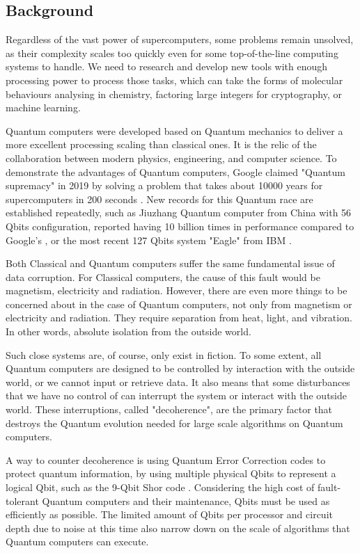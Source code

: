 \subsection{Background}

Regardless of the vast power of supercomputers, some problems remain unsolved, as their complexity scales too quickly even for some top-of-the-line computing systems to handle. 
We need to research and develop new tools with enough processing power to process those tasks, which can take the forms of molecular behaviours analysing in chemistry, factoring large integers for cryptography, or machine learning.

Quantum computers were developed based on Quantum mechanics to deliver a more excellent processing scaling than classical ones.
It is the relic of the collaboration between modern physics, engineering, and computer science.
To demonstrate the advantages of Quantum computers, Google claimed "Quantum supremacy" in 2019 by solving a problem that takes about 10000 years for supercomputers in 200 seconds \cite{hsuGoogleQuantumTech2019}.
New records for this Quantum race are established repeatedly, such as Jiuzhang Quantum computer from China with 56 Qbits configuration, reported having 10 billion times in performance compared to Google's \cite{zhongQuantumComputationalAdvantage2020}, or the most recent 127 Qbits system "Eagle" from IBM \cite{chow2021ibm}.

Both Classical and Quantum computers suffer the same fundamental issue of data corruption.
For Classical computers, the cause of this fault would be magnetism, electricity and radiation.
However, there are even more things to be concerned about in the case of Quantum computers, not only from magnetism or electricity and radiation. They require separation from heat, light, and vibration. In other words, absolute isolation from the outside world.

Such close systems are, of course, only exist in fiction. 
To some extent, all Quantum computers are designed to be controlled by interaction with the outside world, or we cannot input or retrieve data.
It also means that some disturbances that we have no control of can interrupt the system or interact with the outside world.
These interruptions, called "decoherence", are the primary factor that destroys the Quantum evolution needed for large scale algorithms on Quantum computers.

A way to counter decoherence is using Quantum Error Correction codes \cite{lidar2013quantum} to protect quantum information, by using multiple physical Qbits to represent a logical Qbit, such as the 9-Qbit Shor code \cite{shor1995scheme}.
Considering the high cost of fault-tolerant Quantum computers and their maintenance, Qbits must be used as efficiently as possible. 
The limited amount of Qbits per processor and circuit depth due to noise at this time also narrow down on the scale of algorithms that Quantum computers can execute.

